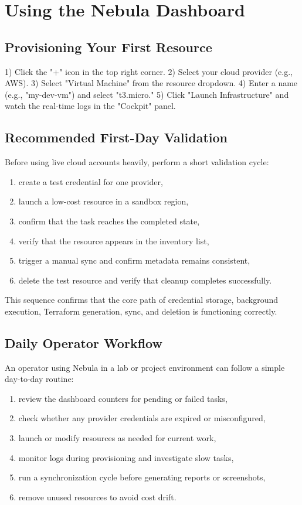 \section{Using the Nebula Dashboard}

\subsection{Provisioning Your First Resource}
1) Click the "+" icon in the top right corner.
2) Select your cloud provider (e.g., AWS).
3) Select "Virtual Machine" from the resource dropdown.
4) Enter a name (e.g., "my-dev-vm") and select "t3.micro."
5) Click "Launch Infrastructure" and watch the real-time logs in the "Cockpit" panel.

\subsection{Recommended First-Day Validation}
Before using live cloud accounts heavily, perform a short validation cycle:
\begin{enumerate}
    \item create a test credential for one provider,
    \item launch a low-cost resource in a sandbox region,
    \item confirm that the task reaches the completed state,
    \item verify that the resource appears in the inventory list,
    \item trigger a manual sync and confirm metadata remains consistent,
    \item delete the test resource and verify that cleanup completes successfully.
\end{enumerate}
This sequence confirms that the core path of credential storage, background execution, Terraform generation, sync, and deletion is functioning correctly.

\subsection{Daily Operator Workflow}
An operator using Nebula in a lab or project environment can follow a simple day-to-day routine:
\begin{enumerate}
    \item review the dashboard counters for pending or failed tasks,
    \item check whether any provider credentials are expired or misconfigured,
    \item launch or modify resources as needed for current work,
    \item monitor logs during provisioning and investigate slow tasks,
    \item run a synchronization cycle before generating reports or screenshots,
    \item remove unused resources to avoid cost drift.
\end{enumerate}

